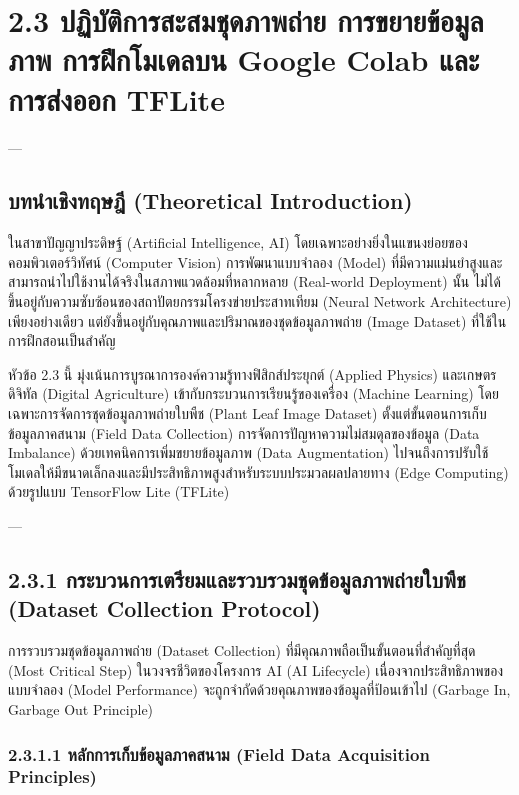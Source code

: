\documentclass[11pt,a4paper,openany]{report}
\begin{document}
\chapter{2.3 ปฏิบัติการสะสมชุดภาพถ่าย การขยายข้อมูลภาพ การฝึกโมเดลบน Google Colab และการส่งออก TFLite}


---

\section{บทนำเชิงทฤษฎี (Theoretical Introduction)}


ในสาขาปัญญาประดิษฐ์ (Artificial Intelligence, AI) โดยเฉพาะอย่างยิ่งในแขนงย่อยของคอมพิวเตอร์วิทัศน์ (Computer Vision) การพัฒนาแบบจำลอง (Model) ที่มีความแม่นยำสูงและสามารถนำไปใช้งานได้จริงในสภาพแวดล้อมที่หลากหลาย (Real-world Deployment) นั้น ไม่ได้ขึ้นอยู่กับความซับซ้อนของสถาปัตยกรรมโครงข่ายประสาทเทียม (Neural Network Architecture) เพียงอย่างเดียว แต่ยังขึ้นอยู่กับคุณภาพและปริมาณของชุดข้อมูลภาพถ่าย (Image Dataset) ที่ใช้ในการฝึกสอนเป็นสำคัญ

หัวข้อ 2.3 นี้ มุ่งเน้นการบูรณาการองค์ความรู้ทางฟิสิกส์ประยุกต์ (Applied Physics) และเกษตรดิจิทัล (Digital Agriculture) เข้ากับกระบวนการเรียนรู้ของเครื่อง (Machine Learning) โดยเฉพาะการจัดการชุดข้อมูลภาพถ่ายใบพืช (Plant Leaf Image Dataset) ตั้งแต่ขั้นตอนการเก็บข้อมูลภาคสนาม (Field Data Collection) การจัดการปัญหาความไม่สมดุลของข้อมูล (Data Imbalance) ด้วยเทคนิคการเพิ่มขยายข้อมูลภาพ (Data Augmentation) ไปจนถึงการปรับใช้โมเดลให้มีขนาดเล็กลงและมีประสิทธิภาพสูงสำหรับระบบประมวลผลปลายทาง (Edge Computing) ด้วยรูปแบบ TensorFlow Lite (TFLite)

---

\section{2.3.1 กระบวนการเตรียมและรวบรวมชุดข้อมูลภาพถ่ายใบพืช (Dataset Collection Protocol)}


การรวบรวมชุดข้อมูลภาพถ่าย (Dataset Collection) ที่มีคุณภาพถือเป็นขั้นตอนที่สำคัญที่สุด (Most Critical Step) ในวงจรชีวิตของโครงการ AI (AI Lifecycle) เนื่องจากประสิทธิภาพของแบบจำลอง (Model Performance) จะถูกจำกัดด้วยคุณภาพของข้อมูลที่ป้อนเข้าไป (Garbage In, Garbage Out Principle)

\subsection{2.3.1.1 หลักการเก็บข้อมูลภาคสนาม (Field Data Acquisition Principles)}
\end{document}
